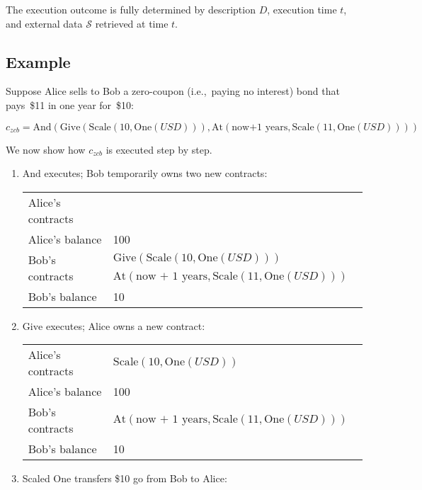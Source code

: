 The execution outcome is fully determined by description $D$, execution time $t$, and external data $\mathcal{S}$ retrieved at time $t$.


\subsection{Example}

Suppose Alice sells to Bob a zero-coupon (i.e.,~paying no interest) bond that pays~\$11 in one year for~\$10:

\[c_{zcb} = \mathrm{And}(\mathrm{Give}(\mathrm{Scale}(10,\mathrm{One}(USD))),\mathrm{At}(\text{now+1 years},\mathrm{Scale}(11,\mathrm{One}(USD))))\]

We now show how \(c_{zcb}\) is executed step by step.

\begin{enumerate}
	
	\item \(\mathrm{And}\) executes; Bob temporarily owns two new contracts:
	
	\begin{tabular}{| p{0.25\linewidth} | p{0.75\linewidth} |}
		\hline
		Alice's contracts & \\
		Alice's balance & 100 \\
		\multirow{2}{10em}{Bob's contracts} & \(\mathrm{Give}(\mathrm{Scale}(10,\mathrm{One}(USD)))\)\\
		& \(\mathrm{At}(\text{now + 1 years},\mathrm{Scale}(11,\mathrm{One}(USD)))\)\\
		Bob's balance & 10 \\
		\hline    
	\end{tabular}
	
	\item \(\mathrm{Give}\) executes; Alice owns a new contract:
	
	\begin{tabular}{| p{0.25\linewidth} | p{0.75\linewidth} |}
		\hline
		Alice's contracts & \(\mathrm{Scale}(10,\mathrm{One}(USD))\) \\
		Alice's balance & 100 \\
		Bob's contracts & \(\mathrm{At}(\text{now + 1 years},\mathrm{Scale}(11,\mathrm{One}(USD)))\) \\
		Bob's balance & 10 \\
		\hline    
	\end{tabular}
	
	\item Scaled \(\mathrm{One}\) transfers \$10 go from Bob to Alice:
	

\end{enumerate}
